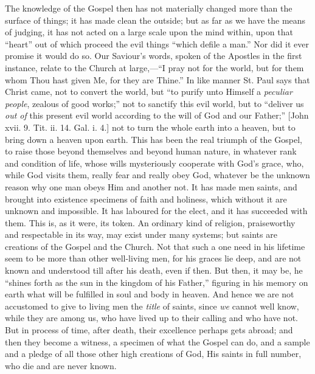 The knowledge of the Gospel then has not materially changed more
than the surface of things; it has made clean the outside; but as far
as we have the means of judging, it has not acted on a large scale
upon the mind within, upon that ``heart'' out of which proceed
the evil things ``which defile a man.'' Nor did it ever
promise it would do so. Our Saviour's words, spoken of the Apostles in
the first instance, relate to the Church at large,—``I pray not
for the world, but for them whom Thou hast given Me, for they are
Thine.'' In like manner St. Paul says that Christ came, not to
convert the world, but ``to purify unto Himself a \emph{peculiar
people}, zealous of good works;'' not to sanctify this evil
world, but to ``deliver us \emph{out of} this present evil world
according to the will of God and our Father;'' [John xvii. 9. Tit.
ii. 14. Gal. i. 4.] not to turn the whole earth into a heaven, but to
bring down a heaven upon earth. This has been the real triumph of the
Gospel, to raise those beyond themselves and beyond human nature, in
whatever rank and condition of life, whose wills mysteriously
cooperate with God's grace, who, while God visits them, really fear
and really obey God, whatever be the unknown reason why one man obeys
Him and another not. It has made men saints, and brought into
existence specimens of faith and holiness, which without it are
unknown and impossible. It has laboured for the elect, and it has
succeeded with them. This is, as it were, its token. An ordinary kind
of religion, praiseworthy and respectable in its way, may exist under
many systems; but saints are creations of the Gospel and the Church.
Not that such a one need in his lifetime seem to be more than other
well-living men, for his graces lie deep, and are not known and
understood till after his death, even if then. But then, it may be, he
``shines forth as the sun in the kingdom of his Father,''
figuring in his memory on earth what will be fulfilled in soul and
body in heaven. And hence we are not accustomed to give to living men
the \emph{title} of saints, since \emph{we} cannot well know, while
they are among us, who have lived up to their calling and who have
not. But in process of time, after death, their excellence perhaps
gets abroad; and then they become a witness, a specimen of what the
Gospel can do, and a sample and a pledge of all those other high
creations of God, His saints in full number, who die and are never
known.

